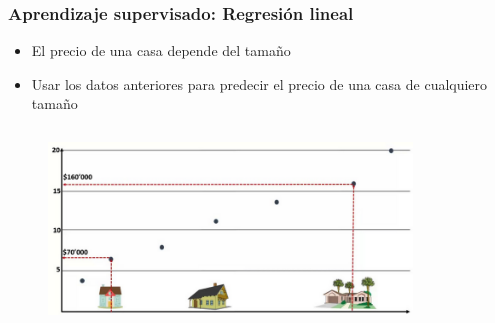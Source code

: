 \documentclass[10pt]{beamer}
\begin{document}
\begin{frame}
\frametitle{Aprendizaje supervisado: Regresi\'on lineal}
\begin{beamerboxesrounded}[upper=uppercolor, lower=lowercolor, shadow=true]{} 

\begin{itemize}
 \item El precio de una casa depende del tama\~no
 \item Usar los datos anteriores para predecir el precio de una casa de cualquiero tama\~no
  
\end{itemize}
\end{beamerboxesrounded}

\begin{columns}

\hspace{5mm}
\hspace{5mm}
\begin{column}{\textwidth}
 \begin{figure}
 \includegraphics[scale=0.3]{./Figures/linear.png} 
 \end{figure}
\end{column}%

\begin{column}{.33\textwidth}
 \begin{figure}
 \end{figure}  
\end{column}%

\end{columns}

\end{frame}
\end{document}
